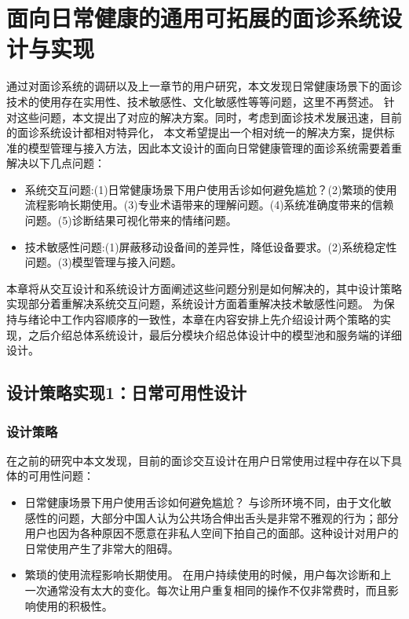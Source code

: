 \chapter{面向日常健康的通用可拓展的面诊系统设计与实现}

通过对面诊系统的调研以及上一章节的用户研究，本文发现日常健康场景下的面诊技术的使用存在实用性、技术敏感性、文化敏感性等等问题，这里不再赘述。
针对这些问题，本文提出了对应的解决方案。同时，考虑到面诊技术发展迅速，目前的面诊系统设计都相对特异化，
本文希望提出一个相对统一的解决方案，提供标准的模型管理与接入方法，因此本文设计的面向日常健康管理的面诊系统需要着重解决以下几点问题：
\begin{itemize}
    \item 系统交互问题:(1)日常健康场景下用户使用舌诊如何避免尴尬？(2)繁琐的使用流程影响长期使用。(3)专业术语带来的理解问题。(4)系统准确度带来的信赖问题。(5)诊断结果可视化带来的情绪问题。
    \item 技术敏感性问题:(1)屏蔽移动设备间的差异性，降低设备要求。(2)系统稳定性问题。(3)模型管理与接入问题。
\end{itemize}

本章将从交互设计和系统设计方面阐述这些问题分别是如何解决的，其中设计策略实现部分着重解决系统交互问题，系统设计方面着重解决技术敏感性问题。
为保持与绪论中工作内容顺序的一致性，本章在内容安排上先介绍设计两个策略的实现，之后介绍总体系统设计，最后分模块介绍总体设计中的模型池和服务端的详细设计。

\section{设计策略实现1：日常可用性设计}

\subsection{设计策略}
在之前的研究中本文发现，目前的面诊交互设计在用户日常使用过程中存在以下具体的可用性问题：
\begin{itemize}
    \item 日常健康场景下用户使用舌诊如何避免尴尬？
    与诊所环境不同，由于文化敏感性的问题，大部分中国人认为公共场合伸出舌头是非常不雅观的行为；部分用户也因为各种原因不愿意在非私人空间下拍自己的面部。这种设计对用户的日常使用产生了非常大的阻碍。
    \item 繁琐的使用流程影响长期使用。
    在用户持续使用的时候，用户每次诊断和上一次通常没有太大的变化。每次让用户重复相同的操作不仅非常费时，而且影响使用的积极性。
\end{itemize}

